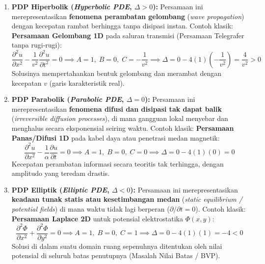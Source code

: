 \documentclass[11pt,a4paper]{article}
\theoremstyle{definition}
\begin{document}
\begin{enumerate}[leftmargin=*]
    \item \textbf{PDP Hiperbolik (\textit{Hyperbolic PDE}, $\Delta > 0$):}
    Persamaan ini merepresentasikan \textbf{fenomena perambatan gelombang} (\textit{wave propagation}) dengan kecepatan rambat berhingga tanpa disipasi instan. 
    Contoh klasik: \textbf{Persamaan Gelombang 1D} pada saluran transmisi (Persamaan Telegrafer tanpa rugi-rugi):
    \begin{equation}
        \frac{\partial^2 u}{\partial x^2} - \frac{1}{v^2} \frac{\partial^2 u}{\partial t^2} = 0 \implies A = 1, \; B = 0, \; C = -\frac{1}{v^2} \implies \Delta = 0 - 4(1)\left(-\frac{1}{v^2}\right) = \frac{4}{v^2} > 0
    \end{equation}
    Solusinya mempertahankan bentuk gelombang dan merambat dengan kecepatan $v$ (garis karakteristik real).

    \item \textbf{PDP Parabolik (\textit{Parabolic PDE}, $\Delta = 0$):}
    Persamaan ini merepresentasikan \textbf{fenomena difusi dan disipasi tak dapat balik} (\textit{irreversible diffusion processes}), di mana gangguan lokal menyebar dan menghalus secara eksponensial seiring waktu.
    Contoh klasik: \textbf{Persamaan Panas/Difusi 1D} pada kabel daya atau penetrasi medan magnetik:
    \begin{equation}
        \frac{\partial^2 u}{\partial x^2} - \frac{1}{\alpha} \frac{\partial u}{\partial t} = 0 \implies A = 1, \; B = 0, \; C = 0 \implies \Delta = 0 - 4(1)(0) = 0
    \end{equation}
    Kecepatan perambatan informasi secara teoritis tak terhingga, dengan amplitudo yang teredam drastis.

    \item \textbf{PDP Elliptik (\textit{Elliptic PDE}, $\Delta < 0$):}
    Persamaan ini merepresentasikan \textbf{keadaan tunak statis atau kesetimbangan medan} (\textit{static equilibrium / potential fields}) di mana waktu tidak lagi berperan ($\partial/\partial t = 0$).
    Contoh klasik: \textbf{Persamaan Laplace 2D} untuk potensial elektrostatika $\Phi(x, y)$:
    \begin{equation}
        \frac{\partial^2 \Phi}{\partial x^2} + \frac{\partial^2 \Phi}{\partial y^2} = 0 \implies A = 1, \; B = 0, \; C = 1 \implies \Delta = 0 - 4(1)(1) = -4 < 0
    \end{equation}
    Solusi di dalam suatu domain ruang sepenuhnya ditentukan oleh nilai potensial di seluruh batas penutupnya (Masalah Nilai Batas / BVP).
\end{enumerate}
\end{document}
